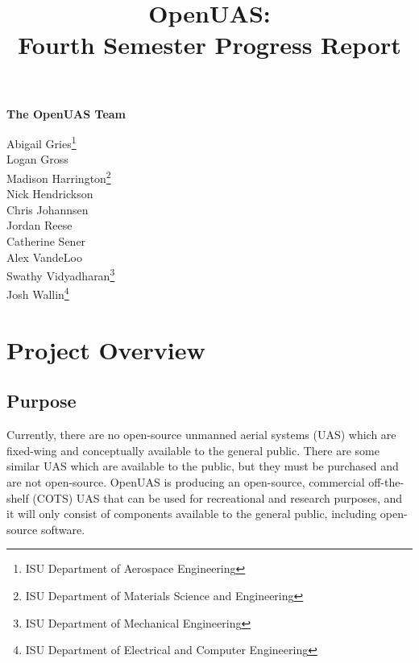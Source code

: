 \documentclass{article}
\title{OpenUAS:\\Fourth Semester Progress Report }
\author{ }
\begin{document}
\maketitle

\newpage

\begin{center}
\Large \textbf{The OpenUAS Team}

\vspace{1cm}

\large{
Abigail Gries\footnote[1]{ISU Department of Aerospace Engineering}\\ Logan Gross\footnotemark[1]\\ Madison Harrington\footnote[2]{ISU Department of Materials Science and Engineering}\\ Nick Hendrickson\footnotemark[1]\\ Chris Johannsen\footnotemark[1]\\ Jordan Reese\footnotemark[1]\\ Catherine Sener\footnotemark[1]\\ Alex VandeLoo\footnotemark[1]\\ Swathy Vidyadharan\footnote[3]{ISU Department of Mechanical Engineering}\\ Josh Wallin\footnote[4]{ISU Department of Electrical and Computer Engineering}\\ 
}\par

\end{center}

\newpage


\tableofcontents

\section{Project Overview}

\subsection{Purpose}
Currently, there are no open-source unmanned aerial systems (UAS) which are fixed-wing and conceptually available to the general public. There are some similar UAS which are available to the public, but they must be purchased and are not open-source. OpenUAS is producing an open-source, commercial off-the-shelf (COTS) UAS that can be used for recreational and research purposes, and it will only consist of components available to the general public, including open-source software.
\end{document}
